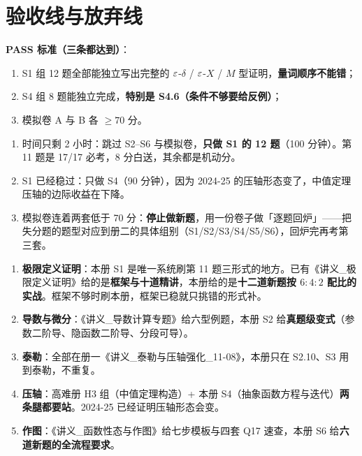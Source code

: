 \newpage
\section{验收线与放弃线}

\begin{warnbox}[验收线]
\textbf{PASS 标准（三条都达到）}：
\begin{enumerate}
\item S1 组 12 题全部能独立写出完整的 $\varepsilon$-$\delta$ / $\varepsilon$-$X$ / $M$ 型证明，\textbf{量词顺序不能错}；
\item S4 组 8 题能独立完成，\textbf{特别是 S4.6（条件不够要给反例）}；
\item 模拟卷 A 与 B 各 $\geq70$ 分。
\end{enumerate}
\end{warnbox}

\begin{keypoint}
\begin{enumerate}
\item 时间只剩 2 小时：跳过 S2--S6 与模拟卷，\textbf{只做 S1 的 12 题}（100 分钟）。第 11 题是 17/17 必考，8 分白送，其余都是机动分。
\item S1 已经稳过：只做 S4（90 分钟），因为 2024-25 的压轴形态变了，中值定理压轴的边际收益在下降。
\item 模拟卷连着两套低于 70 分：\textbf{停止做新题}，用一份卷子做「逐题回炉」——把失分题的题型对应到册二的具体组别（S1/S2/S3/S4/S5/S6），回炉完再考第三套。
\end{enumerate}
\end{keypoint}

\begin{keypoint}[册二与已有材料的分工]
\begin{enumerate}
\item \textbf{极限定义证明}：本册 S1 是唯一系统刷第 11 题三形式的地方。已有《讲义\_极限定义证明》给的是\textbf{框架与十道精讲}，本册给的是\textbf{十二道新题按 $6:4:2$ 配比的实战}。框架不够时刷本册，框架已稳就只挑错的形式补。
\item \textbf{导数与微分}：《讲义\_导数计算专题》给六型例题，本册 S2 给\textbf{真题级变式}（参数二阶导、隐函数二阶导、分段可导）。
\item \textbf{泰勒}：全部在册一《讲义\_泰勒与压轴强化\_11-08》，本册只在 S2.10、S3 用到泰勒，不重复。
\item \textbf{压轴}：高难册 H3 组（中值定理构造）+ 本册 S4（抽象函数方程与迭代）\textbf{两条腿都要站}。2024-25 已经证明压轴形态会变。
\item \textbf{作图}：《讲义\_函数性态与作图》给七步模板与四套 Q17 速查，本册 S6 给\textbf{六道新题的全流程要求}。
\end{enumerate}
\end{keypoint}
